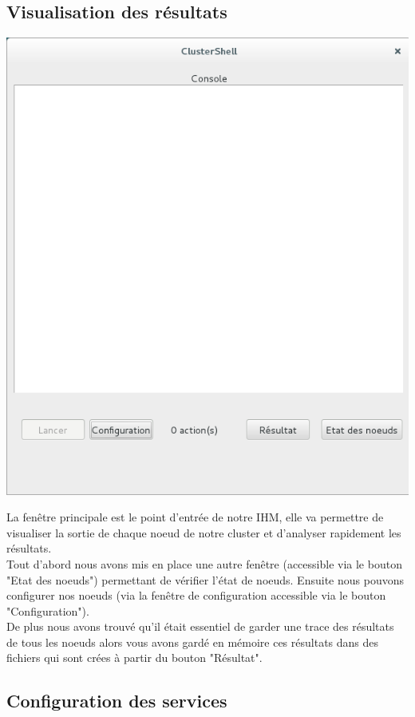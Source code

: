 \documentclass[a4paper,11pt]{article}
\begin{document}
\subsection{Visualisation des résultats}
\begin{center}
\includegraphics[scale=0.6]{fenetre_principale.png} 
\end{center}
La fenêtre principale est le point d'entrée de notre IHM, elle va permettre de visualiser la sortie de chaque noeud de notre cluster et d'analyser rapidement les résultats.\\
Tout d'abord nous avons mis en place une autre fenêtre (accessible via le bouton "Etat des noeuds") permettant de vérifier l'état de noeuds. Ensuite nous pouvons configurer nos noeuds (via la fenêtre de configuration accessible via le bouton "Configuration").\\
De plus nous avons trouvé qu'il était essentiel de garder une trace des résultats de tous les noeuds alors vous avons gardé en mémoire ces résultats dans des fichiers qui sont crées à partir du bouton "Résultat".

\subsection{Configuration des services}
\end{document}
